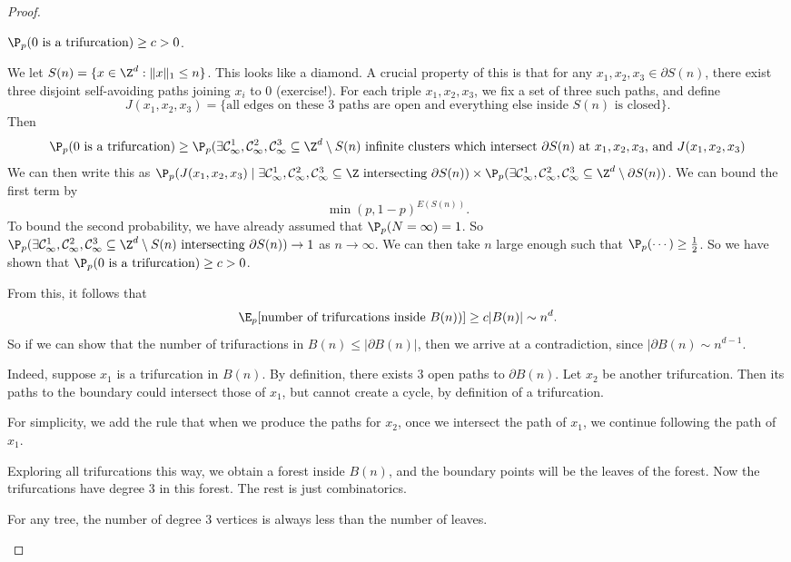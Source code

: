 \documentclass[a4paper]{article}
\begin{document}
\begin{proof}
  \begin{claim}
    $\P_p(0\text{ is a trifurcation})\geq c > 0$.
  \end{claim}
   We let $S(n) = \{x \in \Z^d: \|x\|_1 \leq n\}$. This looks like a diamond. A crucial property of this is that for any $x_1, x_2, x_3 \in \partial S(n)$, there exist three disjoint self-avoiding paths joining $x_i$ to $0$ (exercise!). For each triple $x_1, x_2, x_3$, we fix a set of three such paths, and define
   \[
     J(x_1, x_2, x_3) = \{\text{all edges on these 3 paths are open and everything else inside $S(n)$ is closed}\}.
   \]
   Then
   \[
     \P_p(0 \text{ is a trifurcation}) \geq \P_p(\exists \mathcal{C}_\infty^1, \mathcal{C}_\infty^2, \mathcal{C}_\infty^3 \subseteq \Z^d \setminus S(n) \text{ infinite clusters which intersect $\partial S(n)$ at $x_1, x_2, x_3$, and $J(x_1, x_2, x_3)$} %
   \]
   We can then write this as $\P_p(J(x_1, x_2, x_3) \mid\exists \mathcal{C}_\infty^1, \mathcal{C}_\infty^2, \mathcal{C}_\infty^3 \subseteq \Z\text{ intersecting }\partial S(n)) \times \P_p(\exists \mathcal{C}_\infty^1, \mathcal{C}_\infty^2, \mathcal{C}_\infty^3 \subseteq \Z^d \setminus \partial S(n))$. We can bound the first term by
   \[
     \min(p, 1 - p)^{E(S(n))}.
   \]
   To bound the second probability, we have already assumed that $\P_p(N = \infty) = 1$. So $\P_p(\exists \mathcal{C}_\infty^1, \mathcal{C}_\infty^2, \mathcal{C}_\infty^3 \subseteq \Z^d \setminus S(n)\text{ intersecting }\partial S(n)) \to 1$ as $n \to \infty$. We can then take $n$ large enough such that $\P_p( \cdots ) \geq \frac{1}{2}$. So we have shown that $\P_p(0\text{ is a trifurcation}) \geq c > 0$.

   From this, it follows that
   \[
     \E_p[\text{number of trifurcations inside $B(n)$})] \geq c |B(n)| \sim n^d.
   \]
   So if we can show that the number of trifuractions in $B(n) \leq |\partial B(n)|$, then we arrive at a contradiction, since $|\partial B(n) \sim n^{d - 1}$.

   Indeed, suppose $x_1$ is a trifurcation in $B(n)$. By definition, there exists $3$ open paths to $\partial B(n)$. Let $x_2$ be another trifurcation. Then its paths to the boundary could intersect those of $x_1$, but cannot create a cycle, by definition of a trifurcation.

   For simplicity, we add the rule that when we produce the paths for $x_2$, once we intersect the path of $x_1$, we continue following the path of $x_1$.

   Exploring all trifurcations this way, we obtain a forest inside $B(n)$, and the boundary points will be the leaves of the forest. Now the trifurcations have degree $3$ in this forest. The rest is just combinatorics.
   \begin{claim}
     For any tree, the number of degree $3$ vertices is always less than the number of leaves. %
   \end{claim}
\end{proof}
\end{document}

